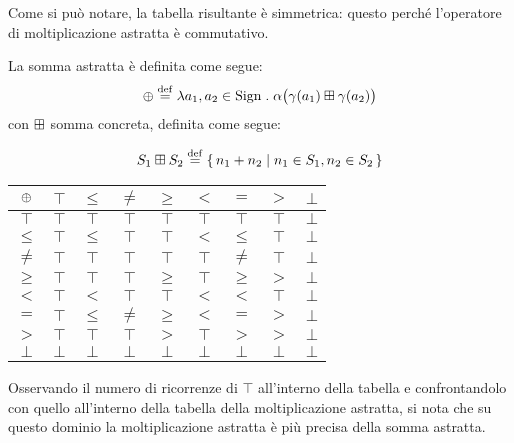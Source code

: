 Come si può notare, la tabella risultante è simmetrica:
questo perché l'operatore di moltiplicazione astratta è commutativo.

\begin{definizione}
La somma astratta è definita come segue:
\[
  \absadd \defeq \lambda a_1,a_2 \in \Sign \st \alpha\bigl(\gamma(a_1) \conadd \gamma(a_2)\bigr)
\]
con $\mathbin{\boxplus}$ somma concreta, definita come segue:

\[
  S_1 \conadd S_2 \defeq \{\, n_1 + n_2 \mid n_1 \in S_1, n_2 \in S_2 \,\}
\]
\end{definizione}

\begin{center}
  \begin{tabular}{c | c c c c c c c c}
    $\mathbin{\oplus}$ & $\top$ & $\leq$ & $\neq$ & $\geq$ & $<$ & $=$ & $>$ & $\bot$ \\
    \hline
    $\top$ & $\top$ & $\top$ & $\top$ & $\top$ & $\top$ & $\top$ & $\top$ & $\bot$ \\
    $\leq$ & $\top$ & $\leq$ & $\top$ & $\top$ & $<$ & $\leq$ & $\top$ & $\bot$\\
    $\neq$ & $\top$ & $\top$ & $\top$ & $\top$ & $\top$ & $\neq$ & $\top$ & $\bot$ \\
    $\geq$ & $\top$ & $\top$ & $\top$ & $\geq$ & $\top$ & $\geq$ & $>$ & $\bot$\\
    $<$ & $\top$ & $<$ & $\top$ & $\top$ & $<$ & $<$ & $\top$ & $\bot$\\
    $=$ & $\top$ & $\leq$ & $\neq$ & $\geq$ & $<$ & $=$ & $>$ & $\bot$\\
    $>$ & $\top$ & $\top$ & $\top$ & $>$ & $\top$ & $>$ & $>$ & $\bot$ \\
    $\bot$ & $\bot$ & $\bot$ & $\bot$ & $\bot$ & $\bot$ & $\bot$ & $\bot$ & $\bot$
  \end{tabular}
\end{center}

Osservando il numero di ricorrenze di $\top$ all'interno della tabella
e confrontandolo con quello all'interno della tabella
della moltiplicazione astratta, si nota che su questo dominio
la moltiplicazione astratta è più precisa della somma astratta.

